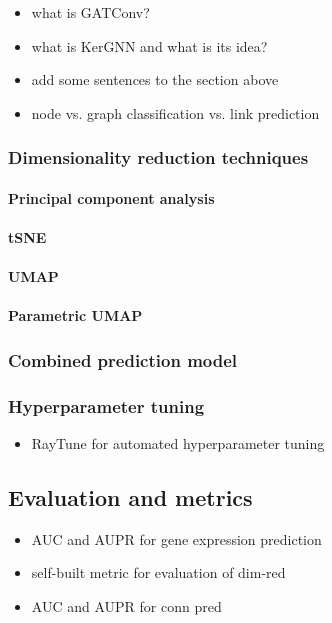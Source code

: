 \documentclass[]{article}
\renewcommand{\cite}{\citep}
\begin{document}
\begin{itemize}
	\item what is GATConv?
	\item what is KerGNN and what is its idea?
	\item add some sentences to the section above
	\item node vs. graph classification vs. link prediction
\end{itemize}

\subsubsection{Dimensionality reduction techniques}
\paragraph{Principal component analysis}

\paragraph{tSNE}

\paragraph{UMAP}

\paragraph{Parametric UMAP}

\subsubsection{Combined prediction model}

\subsubsection{Hyperparameter tuning}
\begin{itemize}
	\item RayTune\cite{liaw2018tune} for automated hyperparameter tuning
\end{itemize}

\subsection{Evaluation and metrics}
\label{sec:evalmetrics}
\begin{itemize}
	\item AUC and AUPR for gene expression prediction
	\item self-built metric for evaluation of dim-red
	\item AUC and AUPR for conn pred
\end{itemize}
\end{document}
